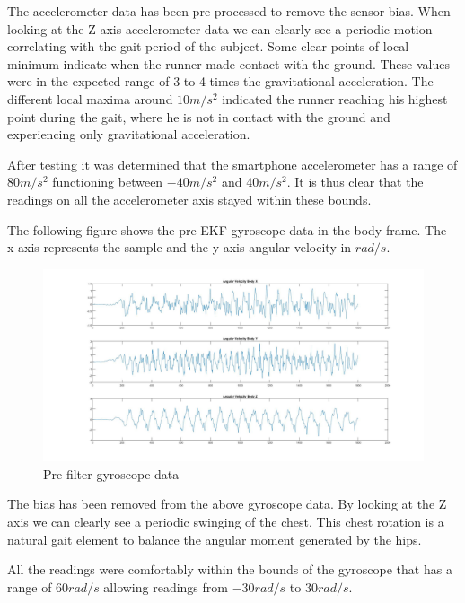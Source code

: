 The accelerometer data has been pre processed to remove the sensor bias. When looking at the Z axis accelerometer data we can clearly see a periodic motion correlating with the gait period of the subject. Some clear points of local minimum indicate when the runner made contact with the ground. These values were in the expected range of 3 to 4 times the gravitational acceleration. The different local maxima around $ 10m/s^2 $ indicated the runner reaching his highest point during the gait, where he is not in contact with the ground and experiencing only gravitational acceleration.

After testing it was determined that the smartphone accelerometer has a range of $ 80m/s^2 $ functioning between $ -40m/s^2 $ and $ 40m/s^2 $. It is thus clear that the readings on all the accelerometer axis stayed within these bounds.



\newpage
The following figure shows the pre EKF gyroscope data in the body frame. The x-axis represents the sample and the y-axis angular velocity in $ rad/s $.

\begin{figure}[!ht] 
\captionsetup{width=0.8\linewidth, font=small}  
\includegraphics[width=1\linewidth]{figures/gyroscope.jpg}
\caption{Pre filter gyroscope data}
\label{fig:gyroscope}
\end{figure}

The bias has been removed from the above gyroscope data. By looking at the Z axis we can clearly see a periodic swinging of the chest. This chest rotation is a natural gait element to balance the angular moment generated by the hips.

All the readings were comfortably within the bounds of the gyroscope that has a range of $ 60 rad/s $ allowing readings from $-30 rad/s $ to $ 30 rad/s $. 


